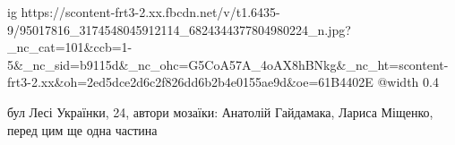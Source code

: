  
 
 
 
 

\ifcmt
  ig https://scontent-frt3-2.xx.fbcdn.net/v/t1.6435-9/95017816_3174548045912114_6824344377804980224_n.jpg?_nc_cat=101&ccb=1-5&_nc_sid=b9115d&_nc_ohc=G5CoA57A_4oAX8hBNkg&_nc_ht=scontent-frt3-2.xx&oh=2ed5dce2d6c2f826dd6b2b4e0155ae9d&oe=61B4402E
  @width 0.4
\fi


бул Лесі Українки, 24, автори мозаїки: Анатолій Гайдамака, Лариса Міщенко,
перед цим ще одна частина

